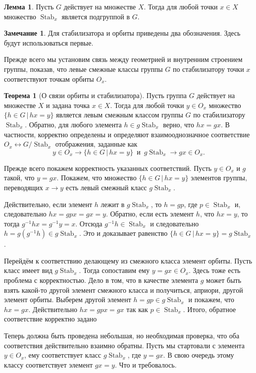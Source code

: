 \documentclass[10pt,a4paper,oneside]{book}
\theoremstyle{definition}
\newtheorem*{rem}{\color{green!50!blue}Замечание}
\newtheorem{thm}{\color{red!40!black}Теорема}
\newtheorem{lem}{\color{green!50!black}Лемма}
\newcommand{\Stab}{\operatorname{Stab}}
\def\thrm{\begin{thm}}
\def\ethrm{\end{thm}}
\def\lm{\begin{lem}}
\def\elm{\end{lem}}
\def\rm{\begin{rem}}
\def\erm{\end{rem}}
\begin{document}
\lm Пусть $G$ действует на множестве $X$. Тогда для любой точки $x\in X$ множество $\Stab_x$ является подгруппой в $G$.
\elm

\rm
Для стабилизатора и орбиты приведены два обозначения. Здесь будут использоваться первые.
\erm








Прежде всего мы установим связь между геометрией  и внутренним строением группы, показав, что  левые смежные классы группы $G$ по стабилизатору точки $x$ соответствуют точкам орбиты $O_x$.

\thrm[О связи орбиты и стабилизатора] Пусть группа $G$ действует на множестве $X$ и задана точка $x \in X$. Тогда для любой точки $y \in O_x$ множество $\{h\in G\,|\, hx=y\}$ является левым смежным классом группы $G$ по стабилизатору $\Stab_x$. Обратно, для любого элемента $h\in g\Stab_x$ верно, что $hx=gx$. В частности, корректно определены и определяют взаимооднозначное соответствие $O_x \leftrightarrow G/\Stab_x$ отображения, заданные как $$y\in O_x \to \{h\in G\,|\, hx=y\}\, \text{ и }\, g\Stab_x \to gx \in O_x.$$
\ethrm
\proof Прежде всего покажем корректность указанных соответствий. Пусть $y\in O_x$ и $g$ такой, что $y=gx$. Покажем, что множество $\{h\in G\,|\, hx=y\}$ элементов группы, переводящих $x \to y$ есть левый смежный класс $g\Stab_x$. 

Действительно, если элемент $h$ лежит в $g\Stab_x$, то $h=gp$, где $p \in\Stab_x$ и, следовательно $hx=gpx=gx=y$. Обратно, если есть элемент $h$, что $hx=y$, то тогда $g^{-1}hx=g^{-1}y=x$. Отсюда $g^{-1}h \in\Stab_x$ и следовательно $h=g(g^{-1}h) \in g\Stab_x$. Это и доказывает равенство $\{h\in G\,|\, hx=y\}=g\Stab_x$.


Перейдём к соответствию делающему из смежного класса элемент орбиты. Пусть класс имеет вид $g\Stab_x$. Тогда сопоставим ему $y=gx \in O_x$. Здесь тоже есть проблема с корректностью. Дело в том, что в качестве элемента $g$ может быть взять какой-то другой элемент смежного класса и получиться, априори, другой элемент орбиты. Выберем другой элемент $h=gp\in g\Stab_x$ и  покажем, что $hx=gx$. Действительно $hx=gpx=gx$ так как $p\in\Stab_x$. Итого, обратное соответствие корректно задано

Теперь должна быть проведена небольшая, но необходимая проверка, что оба соответствия действительно взаимно обратны. 
Пусть мы стартовали с элемента $y\in O_x$, ему соответствует класс $g\Stab_x$, где $y=gx$. В свою очередь этому классу соответствует элемент $gx=y$. Что и требовалось. 
\end{document}

